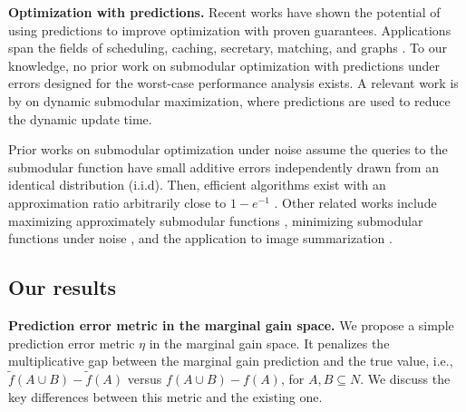 \noindent \textbf{Optimization with predictions.} Recent works have shown the potential of using predictions to improve optimization with proven guarantees. Applications span the fields of scheduling, caching, secretary, matching, and graphs \cite{ImproveOnlineAlgorithmsViaML,cachingWithPredictions,secretaryWithPredictions,matchingWithPredictions,errorMetricsForGraphs}. To our knowledge, no prior work on submodular optimization with predictions under errors designed for the worst-case performance analysis exists. A relevant work is by \cite{learningAugmentedSubmodularUpdates} on dynamic submodular maximization, where predictions are used to reduce the dynamic update time. %

Prior works on submodular optimization under noise assume the queries to the submodular function have small additive errors independently drawn from an identical distribution (i.i.d). Then, efficient algorithms exist with an approximation ratio arbitrarily close to $1 - e^{-1}$ \cite{submodularOptNoise}. 
Other related works include maximizing approximately submodular functions \cite{maximizingApproximatelySubmodularFunctions}, minimizing submodular functions under noise \cite{minimizingSubmodularFunctionsUnderNoise}, and the application to image summarization \cite{submodularOptNoisetoImageCollection}.

\subsection{Our results}

\noindent \textbf{Prediction error metric in the marginal gain space.} 
We propose a simple prediction error metric $\eta$ in the marginal gain space. It penalizes the multiplicative gap between the marginal gain prediction and the true value, i.e., $\tilde{f}(A \cup B) - \tilde{f}(A)$ versus ${f}(A \cup B) - {f}(A)$, for $A, B \subseteq N$. We discuss the key differences between this metric and the existing one. %

